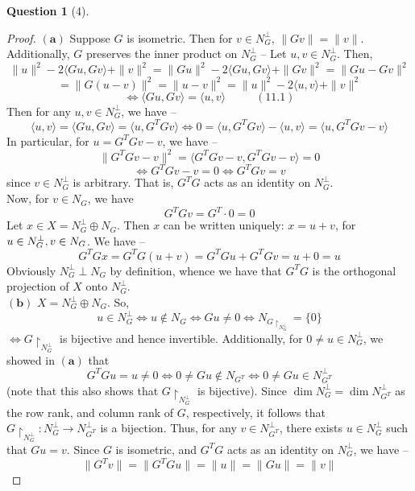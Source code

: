 \documentclass[11pt]{article}
\theoremstyle{quest}
\newtheorem*{question}{Question}
\begin{document}
\begin{question}[4]
\end{question}
\begin{proof}
$\mathbf{(a)}$ Suppose $G$ is isometric. Then for $v \in N_G^{\perp}$, $\|G v \| = \|v\|$. Additionally, $G$ preserves the inner product on $N_G^{\perp}$ -- Let $u,v \in N_G^{\perp}$. Then,
$$\|u\|^2 -2 \langle Gu, Gv \rangle + \|v\|^2 = \|Gu\|^2 -2 \langle Gu, Gv \rangle + \|Gv\|^2 = \|Gu - Gv \|^2$$
$$= \|G (u-v)\|^2 = \|u - v\|^2  = \|u\|^2 -2 \langle u, v \rangle + \|v\|^2$$
$$\iff \langle Gu, Gv \rangle = \langle u, v \rangle\ \ \ \ \ \ \ \ \ \ \ \ (11.1)$$
Then for any $u, v \in N_G^{\perp}$, we have --
$$\langle u, v \rangle = \langle Gu, Gv \rangle = \langle u, G^TG v \rangle \iff 0 = \langle u, G^TGv \rangle - \langle u, v \rangle  = \langle u, G^TGv - v \rangle $$
In particular, for $u = G^TG v - v$, we have --
$$\|G^TGv - v\|^2 = \langle G^TGv - v, G^TGv - v \rangle  = 0$$
$$\iff G^TGv - v = 0 \iff G^TGv = v$$
since $v \in N_G^{\perp}$ is arbitrary. That is, $G^TG$ acts as an identity on $N_G^{\perp}$.
\\Now, for $v \in N_G$, we have
$$G^TGv= G^T \cdot 0 = 0$$
Let $x \in X = N_G^{\perp} \oplus N_G$. Then $x$ can be written uniquely: $x = u +v$, for $u \in N_G^{\perp},\\ v \in N_G$. We have --
$$G^TGx = G^TG(u+v) = G^TGu + G^TGv = u + 0 = u$$
Obviously $N_G^{\perp} \perp N_G$ by definition, whence we have that $G^TG$ is the orthogonal projection of $X$ onto $N_G^{\perp}$.
\\$\mathbf{(b)}$ $X = N_G^{\perp} \oplus N_G$. So,
$$u \in N_G^{\perp} \iff u \not \in N_G \iff Gu \ne 0 \iff N_{G \restriction_{N_G^{\perp}}} = \{0\}$$
$\iff G \restriction_{N_G^{\perp}}$ is bijective and hence invertible. Additionally, for $0 \ne u \in N_G^{\perp}$, we showed in $\mathbf{(a)}$ that
$$G^TGu = u \ne 0 \iff 0 \ne Gu \not\in N_{G^T} \iff 0 \ne Gu \in N_{G^T}^{\perp}$$
(note that this also shows that $G \restriction_{N_G^{\perp}}$ is bijective). Since $\dim N_G^{\perp} = \dim N_{G^T}^{\perp}$ as the row rank, and column rank of $G$, respectively, it follows that $G \restriction_{N_G^{\perp}}: N_G^{\perp} \rightarrow N_{G^T}^{\perp}$ is a bijection. Thus, for any $v \in N_{G^T}^{\perp}$, there exists $u \in N_G^{\perp}$ such that $Gu = v$. Since $G$ is isometric, and $G^TG$ acts as an identity on $N_G^{\perp}$, we have --
$$\|G^Tv\| = \|G^TGu\| = \|u\| = \|Gu\| = \|v\|$$
\end{proof}
\end{document}
